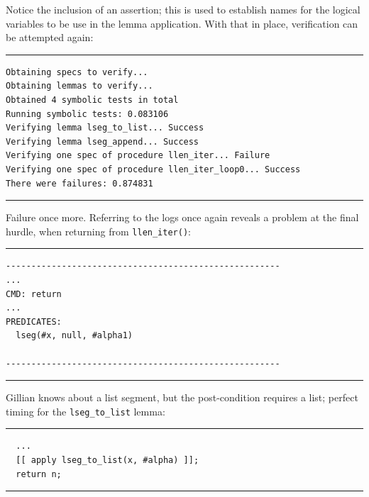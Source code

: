 Notice the inclusion of an assertion; this is used to establish names for the
logical variables to be use in the lemma application. With that in place,
verification can be attempted again:

\noindent\rule{\textwidth}{0.5pt}
\vspace{-0.6cm}
\begin{verbatim}
Obtaining specs to verify...
Obtaining lemmas to verify...
Obtained 4 symbolic tests in total
Running symbolic tests: 0.083106
Verifying lemma lseg_to_list... Success
Verifying lemma lseg_append... Success
Verifying one spec of procedure llen_iter... Failure
Verifying one spec of procedure llen_iter_loop0... Success
There were failures: 0.874831
\end{verbatim}
\vspace{-0.4cm}
\noindent\rule{\textwidth}{0.5pt}
\vspace{-0.6cm}
\vspace{0.5cm}

Failure once more. Referring to the logs once again reveals a problem at the
final hurdle, when returning from \texttt{llen\_iter()}:

\noindent\rule{\textwidth}{0.5pt}
\vspace{-0.6cm}
\begin{verbatim}
------------------------------------------------------
...
CMD: return
...
PREDICATES:
  lseg(#x, null, #alpha1)

------------------------------------------------------
\end{verbatim}
\vspace{-0.4cm}
\noindent\rule{\textwidth}{0.5pt}
\vspace{-0.6cm}
\vspace{0.5cm}

Gillian knows about a list segment, but the post-condition requires a list;
perfect timing for the \texttt{lseg\_to\_list} lemma:

\noindent\rule{\textwidth}{0.5pt}
\vspace{-0.6cm}
\begin{verbatim}
  ...
  [[ apply lseg_to_list(x, #alpha) ]];
  return n;
\end{verbatim}
\vspace{-0.4cm}
\noindent\rule{\textwidth}{0.5pt}
\vspace{-0.6cm}
\vspace{0.5cm}

